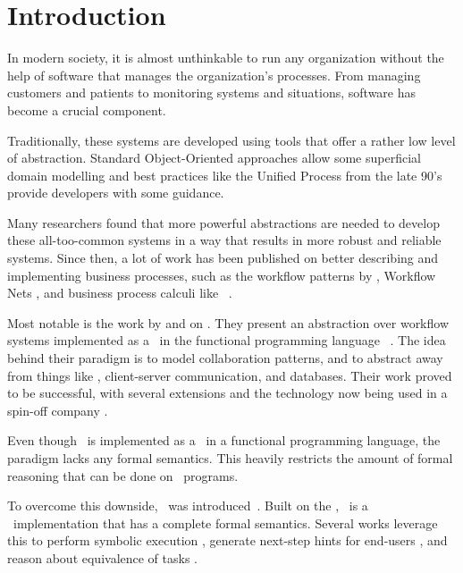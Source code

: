 
\section{Introduction}
\label{sec:introduction}

In modern society, it is almost unthinkable to run any organization without the help of software that manages the organization's processes.
From managing customers and patients to monitoring systems and situations, software has become a crucial component.

Traditionally, these systems are developed using tools that offer a rather low level of abstraction.
Standard Object-Oriented approaches allow some superficial domain modelling and best practices like the Unified Process from the late 90's provide developers with some guidance.

Many researchers found that more powerful abstractions are needed to develop these all-too-common systems in a way that results in more robust and reliable systems.
Since then, a lot of work has been published on better describing and implementing business processes, such as the workflow patterns by \citeauthor{journals/dpd/AalstHKB03}, Workflow Nets \cite{journals/jcsc/Aalst98}, and business process calculi like \BPEL\ \cite{bpel}.

Most notable is the work by \citet{conf/ifl/KoopmanPA08} and \citet{conf/ppdp/PlasmeijerLMAK12} on \ITASKS.
They present an abstraction over workflow systems implemented as a \DSL\ in the functional programming language \CLEAN\ \cite{plasmeijer2002clean}.
The idea behind their paradigm is to model collaboration patterns, and to abstract away from things like \GUI, client-server communication, and databases.
Their work proved to be successful, with several extensions and the technology now being used in a spin-off company \cite{com/tss/viia}.

Even though \ITASKS\ is implemented as a \DSL\ in a functional programming language, the paradigm lacks any formal semantics.
This heavily restricts the amount of formal reasoning that can be done on \ITASKS\ programs.

To overcome this downside, \TOPHAT\ was introduced~\cite{conf/ppdp/SteenvoordenNK19}.
Built on the \STLC,
\TOPHAT\ is a \TOP\ implementation that has a complete formal semantics.
Several works leverage this to perform symbolic execution \cite{conf/ifl/NausSK19},
generate next-step hints for end-users \cite{conf/sfp/NausS20},
and reason about equivalence of tasks \cite{conf/sfp/KlijnsmaS22}.

